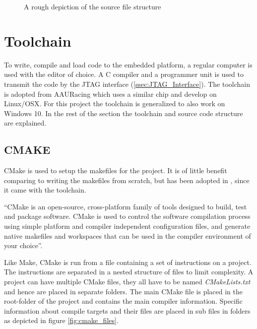\begin{figure}[H]
	\caption{A rough depiction of the source file structure}
	\label{fig:source_structure}
\end{figure}


\section{Toolchain}
To write, compile and load code to the embedded platform,
a regular computer is used with the editor of choice.
A C compiler and a programmer unit is used to transmit the code by the JTAG interface (\ref{ssec:JTAG_Interface}).
The toolchain is adopted from AAURacing\cite{aauracing} which uses a similar chip and develop on Linux/OSX.
For this project the toolchain is generalized to also work on Windows 10.
In the rest of the section the toolchain and source code structure are explained.


\subsection{CMAKE}
\label{ssec:cmake}
CMake is used to setup the makefiles for the project.
It is of little benefit comparing to writing the makefiles from scratch,
but has been adopted in \OSname, since it came with the toolchain.

\begin{displayquote}
``CMake is an open-source, cross-platform family of tools designed to build,
test and package software.
CMake is used to control the software compilation process
using simple platform and compiler independent configuration files,
and generate native makefiles and workspaces
that can be used in the compiler environment of your choice\cite{cmake}''.
\end{displayquote}

Like Make, CMake is run from a file containing a set of instructions on a project.
The instructions are separated in a nested structure of files to limit complexity.
A project can have multiple CMake files,
they all have to be named \textit{CMakeLists.txt} and hence are placed in separate folders.
The main CMake file is placed in the root-folder of the project and contains the main compiler information.
Specific information about compile targets and their files
are placed in sub files in folders as depicted in figure \ref{fig:cmake_files}.

